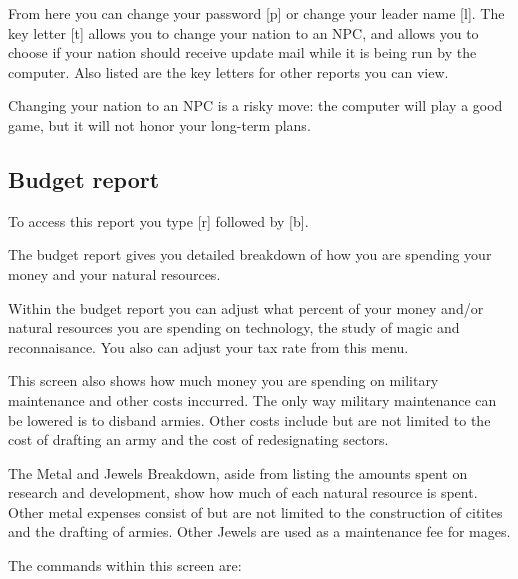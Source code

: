 From here you can change your password [p] or change your leader name
[l].  The key letter [t] allows you to change your nation to an NPC,
and allows you to choose if your nation should receive update mail
while it is being run by the computer.  Also listed are the key
letters for other reports you can view.

Changing your nation to an NPC is a risky move: the computer will play
a good game, but it will not honor your long-term plans.

\subsection{Budget report}
To access this report you type [r] followed by [b].  

The budget report gives you detailed breakdown of how you are spending your 
money and your natural resources.  

Within the budget report you can adjust what percent of your money
and/or natural resources you are spending on technology, the study of
magic and reconnaisance. You also can adjust your tax rate from this
menu.

This screen also shows how much money you are spending on military
maintenance and other costs inccurred. The only way military
maintenance can be lowered is to disband armies. Other costs include
but are not limited to the cost of drafting an army and the cost of
redesignating sectors.

The Metal and Jewels Breakdown, aside from listing the amounts spent
on research and development, show how much of each natural resource is
spent.  Other metal expenses consist of but are not limited to the
construction of citites and the drafting of armies. Other Jewels are
used as a maintenance fee for mages.

The commands within this screen are:

